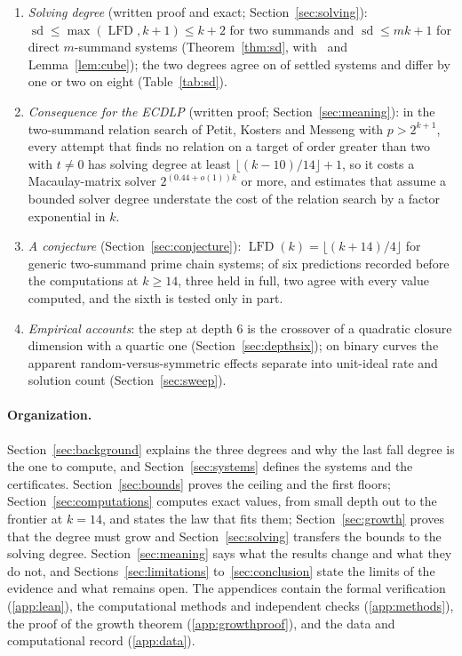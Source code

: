 \documentclass[11pt]{article}
\theoremstyle{definition}\newtheorem{definition}[theorem]{Definition}
\theoremstyle{remark}\newtheorem{remark}[theorem]{Remark}
\newcommand{\lfd}{\operatorname{LFD}}
\newcommand{\sd}{\operatorname{sd}}
\begin{document}
\begin{enumerate}
 (Corollary~\ref{cor:growthm}, written proof).
\item \emph{Solving degree} (written proof and exact;
 Section~\ref{sec:solving}): $\sd\le\max(\lfd,k+1)\le k+2$ for two summands
 and $\sd\le mk+1$ for direct $m$-summand systems (Theorem~\ref{thm:sd},
 with~\cite{cg} and Lemma~\ref{lem:cube}); the two degrees agree on
 \SDEQUAL{} of \SDKNOWN{} settled systems and differ by one or two on eight
 (Table~\ref{tab:sd}).
\item \emph{Consequence for the ECDLP} (written proof;
 Section~\ref{sec:meaning}): in the two-summand relation search of Petit,
 Kosters and Messeng with $p>2^{k+1}$, every attempt that finds no
 relation on a target of order greater than two with $t\ne0$ has solving
 degree at least $\lfloor(k-10)/14\rfloor+1$, so it costs a Macaulay-matrix
 solver
 $2^{(0.44+o(1))k}$ or more, and estimates that assume a bounded solver
 degree understate the cost of the relation search by a factor exponential
 in $k$.
\item \emph{A conjecture} (Section~\ref{sec:conjecture}):
 $\lfd(k)=\lfloor(k+14)/4\rfloor$ for generic two-summand prime chain
 systems; of six predictions recorded before the computations at $k\ge14$,
 three held in full, two agree with every value computed, and the sixth is
 tested only in part.
\item \emph{Empirical accounts}: the step at depth $6$ is the crossover of a
 quadratic closure dimension with a quartic one
 (Section~\ref{sec:depthsix}); on binary curves the apparent
 random-versus-symmetric effects separate into unit-ideal rate and solution
 count (Section~\ref{sec:sweep}).
\end{enumerate}

\paragraph{Organization.} Section~\ref{sec:background} explains the three
degrees and why the last fall degree is the one to compute, and
Section~\ref{sec:systems} defines the systems and the certificates.
Section~\ref{sec:bounds} proves the ceiling and the first floors;
Section~\ref{sec:computations} computes exact values, from small depth out to
the frontier at $k=14$, and states the law that fits them;
Section~\ref{sec:growth} proves that the degree must grow and
Section~\ref{sec:solving} transfers the bounds to the solving degree.
Section~\ref{sec:meaning} says what the results change and what they do not,
and Sections~\ref{sec:limitations} to~\ref{sec:conclusion} state the limits of
the evidence and what remains open. The appendices contain the formal
verification (\ref{app:lean}), the computational methods and independent
checks (\ref{app:methods}), the proof of the growth theorem
(\ref{app:growthproof}), and the data and computational record
(\ref{app:data}).
\end{document}
